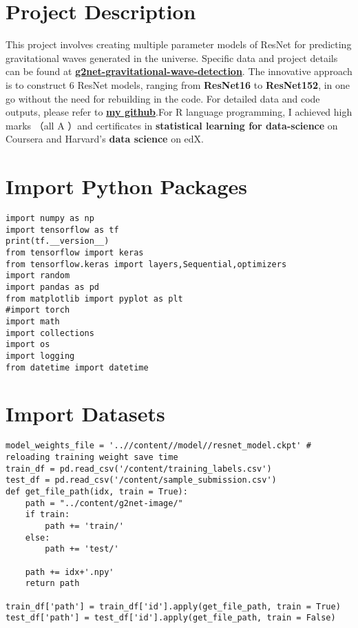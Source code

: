 \section{Project Description}

This project involves creating multiple parameter models of ResNet for predicting gravitational waves generated in the universe. Specific data and project details can be found at \href{https://www.kaggle.com/competitions/g2net-gravitational-wave-detection/overview}{\textbf{g2net-gravitational-wave-detection}}. The innovative approach is to construct 6 ResNet models, ranging from \textbf{ResNet16} to \textbf{ResNet152}, in one go without the need for rebuilding in the code. For detailed data and code outputs, please refer to \href{https://github.com/UCL-XuzeZhang/mutli-ResNet-Model/blob/main/README.md}{\textbf{my github}}.For R language programming, I achieved high marks （all A ）and certificates in \textbf{statistical learning for data-science} on Coursera and Harvard's \textbf{data science} on edX.


\section{Import Python Packages}

\begin{verbatim}
import numpy as np
import tensorflow as tf
print(tf.__version__)
from tensorflow import keras
from tensorflow.keras import layers,Sequential,optimizers
import random
import pandas as pd
from matplotlib import pyplot as plt
#import torch
import math
import collections
import os
import logging
from datetime import datetime
\end{verbatim}

\section{Import Datasets}

\begin{verbatim}
model_weights_file = '..//content//model//resnet_model.ckpt' # reloading training weight save time
train_df = pd.read_csv('/content/training_labels.csv')
test_df = pd.read_csv('/content/sample_submission.csv')
def get_file_path(idx, train = True):
    path = "../content/g2net-image/"
    if train:
        path += 'train/'
    else:
        path += 'test/'

    path += idx+'.npy'
    return path

train_df['path'] = train_df['id'].apply(get_file_path, train = True)
test_df['path'] = test_df['id'].apply(get_file_path, train = False)
\end{verbatim}

